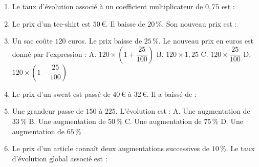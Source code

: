 \documentclass[a4paper,11pt]{article}
\begin{document}
\newpage
\vspace*{1cm}
\begin{seance}{} %

\begin{enumerate}
\item Le taux d'évolution associé à un coefficient multiplicateur de $0{,}75$ est : \dotfill

\item Le prix d'un tee-shirt est $50$\,€. Il baisse de $20\,\%$. Son nouveau prix est : \dotfill

\item Un sac coûte $120$ euros. Le prix baisse de $25\,\%$.
Le nouveau prix en euros est donné par l'expression :
A. $120 \times (1 + \dfrac{25}{100})$ \quad B. $120 \times 1{,}25$ \quad C. $120 \times \dfrac{25}{100}$ \quad D. $120 \times (1 - \dfrac{25}{100})$

\dotfill

\item Le prix d'un sweat est passé de $40$\,€ à $32$\,€. Il a baissé de : \dotfill

\item Une grandeur passe de $150$ à $225$.
L'évolution est :
A. Une augmentation de $33\,\%$ \quad B. Une augmentation de $50\,\%$ \quad C. Une augmentation de $75\,\%$ \quad D. Une augmentation de $65\,\%$

\dotfill

\item Le prix d'un article connaît deux augmentations successives de $10\,\%$.
Le taux d'évolution global associé est : \dotfill

\end{enumerate}

\end{seance}
\end{document}
